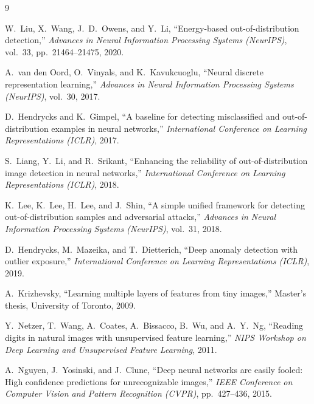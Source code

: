 \documentclass[10pt,twocolumn,letterpaper]{article}
\begin{document}
{\small

\begin{thebibliography}{9}

W.~Liu, X.~Wang, J.~D.~Owens, and Y.~Li,
``Energy-based out-of-distribution detection,''
\emph{Advances in Neural Information Processing Systems (NeurIPS)},
vol.~33, pp.~21464--21475, 2020.

A.~van den Oord, O.~Vinyals, and K.~Kavukcuoglu,
``Neural discrete representation learning,''
\emph{Advances in Neural Information Processing Systems (NeurIPS)},
vol.~30, 2017.

D.~Hendrycks and K.~Gimpel,
``A baseline for detecting misclassified and out-of-distribution
examples in neural networks,''
\emph{International Conference on Learning Representations (ICLR)},
2017.

S.~Liang, Y.~Li, and R.~Srikant,
``Enhancing the reliability of out-of-distribution image detection in
neural networks,''
\emph{International Conference on Learning Representations (ICLR)},
2018.

K.~Lee, K.~Lee, H.~Lee, and J.~Shin,
``A simple unified framework for detecting out-of-distribution samples
and adversarial attacks,''
\emph{Advances in Neural Information Processing Systems (NeurIPS)},
vol.~31, 2018.

D.~Hendrycks, M.~Mazeika, and T.~Dietterich,
``Deep anomaly detection with outlier exposure,''
\emph{International Conference on Learning Representations (ICLR)},
2019.

A.~Krizhevsky,
``Learning multiple layers of features from tiny images,''
Master's thesis, University of Toronto, 2009.

Y.~Netzer, T.~Wang, A.~Coates, A.~Bissacco, B.~Wu, and A.~Y.~Ng,
``Reading digits in natural images with unsupervised feature learning,''
\emph{NIPS Workshop on Deep Learning and Unsupervised Feature Learning},
2011.

A.~Nguyen, J.~Yosinski, and J.~Clune,
``Deep neural networks are easily fooled: High confidence predictions
for unrecognizable images,''
\emph{IEEE Conference on Computer Vision and Pattern Recognition (CVPR)},
pp.~427--436, 2015.

\end{thebibliography}
}
\end{document}
